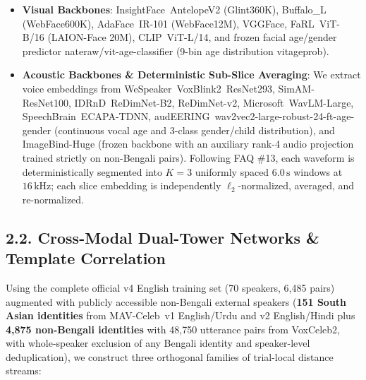 \documentclass[10pt,letterpaper]{article}
\providecommand{\tightlist}{\setlength{\itemsep}{0pt}\setlength{\parskip}{0pt}}
\begin{document}
\begin{itemize}
\tightlist
\item
  \textbf{Visual Backbones}: \textnormal{InsightFace\ AntelopeV2} (Glint360K), \textnormal{Buffalo\_\allowbreak{}L} (WebFace600K), \textnormal{AdaFace\ IR-101} (WebFace12M), \textnormal{VGGFace}, \textnormal{FaRL\ ViT-B/16} (LAION-Face 20M), \textnormal{CLIP\ ViT-L/14}, and frozen facial age/gender predictor \textnormal{nateraw/vit-age-classifier} (9-bin age distribution \textnormal{vitageprob}).
\item
  \textbf{Acoustic Backbones \& Deterministic Sub-Slice Averaging}: We extract voice embeddings from \textnormal{WeSpeaker\ VoxBlink2\ ResNet293}, \textnormal{SimAM-ResNet100}, \textnormal{IDRnD\ ReDimNet-B2}, \textnormal{ReDimNet-v2}, \textnormal{Microsoft\ WavLM-Large}, \textnormal{SpeechBrain\ ECAPA-TDNN}, \textnormal{audEERING\ wav2vec2-large-robust-24-ft-age-gender} (continuous vocal age and 3-class gender/child distribution), and \textnormal{ImageBind-Huge} (frozen backbone with an auxiliary rank-4 audio projection trained strictly on non-Bengali pairs). Following FAQ \#13, each waveform is deterministically segmented into \(K=3\) uniformly spaced \(6.0\,\text{s}\) windows at \(16\,\text{kHz}\); each slice embedding is independently \(\ell_2\)-normalized, averaged, and re-normalized.
\end{itemize}

\subsection*{2.2. Cross-Modal Dual-Tower Networks \& Template Correlation}\label{cross-modal-dual-tower-networks-template-correlation}

Using the complete official \textnormal{v4} English training set (70 speakers, 6,485 pairs) augmented with publicly accessible non-Bengali external speakers (\textbf{151 South Asian identities} from \textnormal{MAV-Celeb\ v1} English/Urdu and \textnormal{v2} English/Hindi plus \textbf{4,875 non-Bengali identities} with 48,750 utterance pairs from \textnormal{VoxCeleb2}, with whole-speaker exclusion of any Bengali identity and speaker-level deduplication), we construct three orthogonal families of trial-local distance streams:
\end{document}
